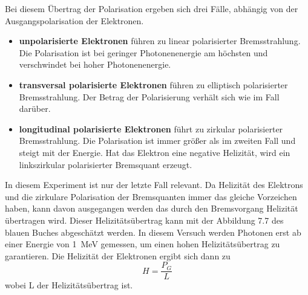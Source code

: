 Bei diesem Übertrag der Polarisation ergeben sich drei Fälle, abhängig von der Ausgangspolarisation der Elektronen. 
\begin{itemize}
    \item \textbf{unpolarisierte Elektronen} führen zu linear polarisierter Bremsstrahlung. Die Polarisation ist bei geringer Photonenenergie am höchsten und verschwindet bei hoher Photonenenergie.
    \item \textbf{transversal polarisierte Elektronen} führen zu elliptisch polarisierter Bremsstrahlung. Der Betrag der Polarisierung verhält sich wie im Fall darüber.
    \item \textbf{longitudinal polarisierte Elektronen} führt zu zirkular polarisierter Bremsstrahlung. Die Polarisation ist immer größer als im zweiten Fall und steigt mit der Energie. Hat das Elektron eine negative Helizität, wird ein linkszirkular polarisierter Bremsquant erzeugt.
\end{itemize}
    In diesem Experiment ist nur der letzte Fall relevant. Da Helizität des Elektrons und die zirkulare Polarisation der Bremsquanten immer das gleiche Vorzeichen haben, kann davon ausgegangen werden das durch den Bremsvorgang Helizität übertragen wird. Dieser Helizitätsübertrag kann mit der Abbildung 7.7 des blauen Buches \cite{BlueBook} abgeschätzt werden. In diesem Versuch werden Photonen erst ab einer Energie von \SI{1}{MeV} gemessen, um einen hohen Helizitätsübertrag zu garantieren. 
    Die Helizität der Elektronen ergibt sich dann zu
    \begin{equation}
        H = \frac{P_G}{L}
        \label{Helizität}
    \end{equation}
    wobei L der Helizitätsübertrag ist. 


